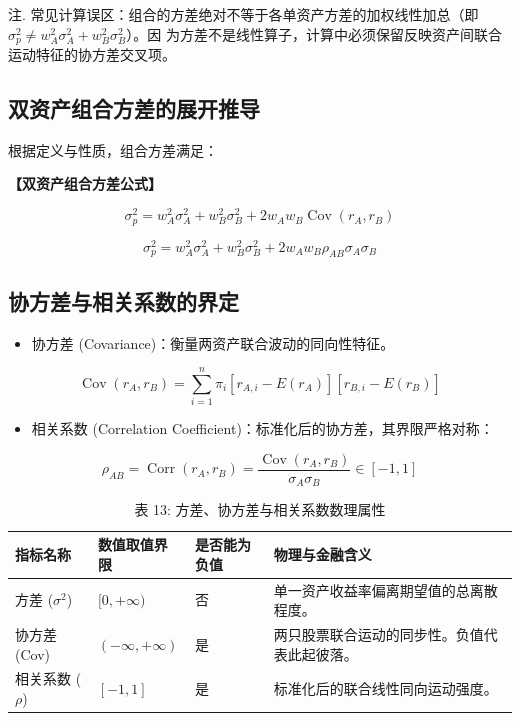 \documentclass[lang=cn,10pt,color=blue]{elegantbook}
\begin{document}
注. 常见计算误区：组合的方差绝对不等于各单资产方差的加权线性加总（即 $\sigma _ { p } ^ { 2 } \ne w _ { A } ^ { 2 } \sigma _ { A } ^ { 2 } + w _ { B } ^ { 2 } \sigma _ { B } ^ { 2 }$）。因 为方差不是线性算子，计算中必须保留反映资产间联合运动特征的协方差交叉项。 

\subsection{双资产组合方差的展开推导}

根据定义与性质，组合方差满足： 

\textbf{\color{UnivColor} 【双资产组合方差公式】} 

$$
\sigma_ {p} ^ {2} = w _ {A} ^ {2} \sigma_ {A} ^ {2} + w _ {B} ^ {2} \sigma_ {B} ^ {2} + 2 w _ {A} w _ {B} \operatorname{Cov} (r _ {A}, r _ {B})
$$

$$
\boxed {\sigma_ {p} ^ {2} = w _ {A} ^ {2} \sigma_ {A} ^ {2} + w _ {B} ^ {2} \sigma_ {B} ^ {2} + 2 w _ {A} w _ {B} \rho_ {A B} \sigma_ {A} \sigma_ {B}}
$$

\subsection{协方差与相关系数的界定}

\begin{itemize}
  \item 协方差 (Covariance)：衡量两资产联合波动的同向性特征。
\end{itemize}

$$
\operatorname{Cov} (r _ {A}, r _ {B}) = \sum_ {i = 1} ^ {n} \pi_ {i} [ r _ {A, i} - E (r _ {A}) ] [ r _ {B, i} - E (r _ {B}) ]
$$

\begin{itemize}
  \item 相关系数 (Correlation Coefficient)：标准化后的协方差，其界限严格对称：
\end{itemize}

$$
\rho_ {A B} = \operatorname{Corr} (r _ {A}, r _ {B}) = \frac {\operatorname{Cov} (r _ {A} , r _ {B})}{\sigma_ {A} \sigma_ {B}} \in [ - 1, 1 ]
$$

\begin{table}[ht]
  \centering
  \caption{表 13: 方差、协方差与相关系数数理属性}
  \renewcommand{\arraystretch}{1.4}
\begin{tabularx}{\textwidth}{llYY}
  \toprule
  指标名称 & 数值取值界限 & 是否能为负值 & 物理与金融含义 \\
  \midrule
  方差 ($\sigma^{2}$) & $[0, +\infty)$ & 否 & 单一资产收益率偏离期望值的总离散程度。 \\
  协方差 (Cov) & $(-\infty, +\infty)$ & 是 & 两只股票联合运动的同步性。负值代表此起彼落。 \\
  相关系数 ($\rho$) & $[-1, 1]$ & 是 & 标准化后的联合线性同向运动强度。 \\
  \bottomrule
\end{tabularx}
\end{table}
\end{document}
